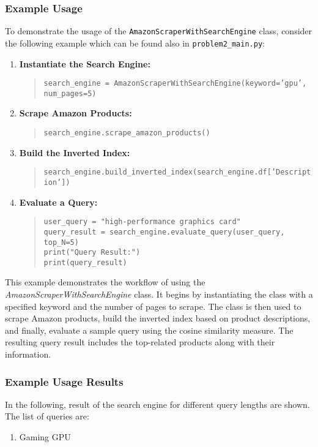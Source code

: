 {		\subsubsection*{Example Usage}
		
		To demonstrate the usage of the \texttt{AmazonScraperWithSearchEngine} class, consider the following example which can be found also in \texttt{problem2\_main.py}:
		
		\begin{enumerate}
			\item \textbf{Instantiate the Search Engine:}
			\begin{quote}
				\texttt{search\_engine = AmazonScraperWithSearchEngine(keyword='gpu', num\_pages=5)}
			\end{quote}
			
			\item \textbf{Scrape Amazon Products:}
			\begin{quote}
				\texttt{search\_engine.scrape\_amazon\_products()}
			\end{quote}
			
			\item \textbf{Build the Inverted Index:}
			\begin{quote}
				\texttt{search\_engine.build\_inverted\_index(search\_engine.df['Description'])}
			\end{quote}
			
			\item \textbf{Evaluate a Query:}
			\begin{quote}
				\texttt{user\_query = "high-performance graphics card"} \\
				\texttt{query\_result = search\_engine.evaluate\_query(user\_query, top\_N=5)} \\
				\texttt{print("Query Result:")} \\
				\texttt{print(query\_result)}
			\end{quote}
		\end{enumerate}
		
		This example demonstrates the workflow of using the \textit{AmazonScraperWithSearchEngine} class. It begins by instantiating the class with a specified keyword and the number of pages to scrape. The class is then used to scrape Amazon products, build the inverted index based on product descriptions, and finally, evaluate a sample query using the cosine similarity measure. The resulting query result includes the top-related products along with their information.
		
		\subsubsection*{Example Usage Results}
		In the following, result of the search engine for different query lengths are shown. The list of queries are:
		\begin{enumerate}
			\item Gaming GPU
			

\end{enumerate}}
